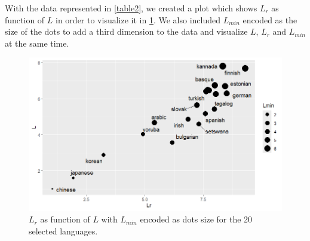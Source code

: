 \newpage
With the data represented in \cref{table2}, we created a plot which shows $L_r$ as function of $L$ in order to visualize it in \cref{plot2}. We also included $L_{min}$ encoded as the size of the dots to add a third dimension to the data and visualize $L$, $L_r$ and $L_{min}$ at the same time.

\begin{figure}[h]
\centering
\includegraphics[width=\textwidth]{images/plot2.png}
\caption{$L_r$ as function of $L$ with $L_{min}$ encoded as dots size for the 20 selected languages.}
\label{plot2}
\end{figure}

